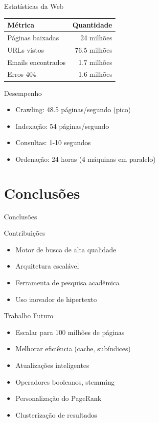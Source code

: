 \documentclass{beamer}
\begin{document}
\begin{frame}{Estatísticas da Web}
    \begin{center}
        \begin{tabular}{|l|r|}
            \hline
            \textbf{Métrica} & \textbf{Quantidade} \\
            \hline
            Páginas baixadas & 24 milhões \\
            URLs vistos & 76.5 milhões \\
            Emails encontrados & 1.7 milhões \\
            Erros 404 & 1.6 milhões \\
            \hline
        \end{tabular}
    \end{center}
\end{frame}

\begin{frame}{Desempenho}
    \begin{itemize}
        \item Crawling: 48.5 páginas/segundo (pico)
        \item Indexação: 54 páginas/segundo
        \item Consultas: 1-10 segundos
        \item Ordenação: 24 horas (4 máquinas em paralelo)
    \end{itemize}
\end{frame}

\section{Conclusões}
\begin{frame}{Conclusões}
    \begin{block}{Contribuições}
        \begin{itemize}
            \item Motor de busca de alta qualidade
            \item Arquitetura escalável
            \item Ferramenta de pesquisa acadêmica
            \item Uso inovador de hipertexto
        \end{itemize}
    \end{block}
\end{frame}

\begin{frame}{Trabalho Futuro}
    \begin{itemize}
        \item Escalar para 100 milhões de páginas
        \item Melhorar eficiência (cache, subíndices)
        \item Atualizações inteligentes
        \item Operadores booleanos, stemming
        \item Personalização do PageRank
        \item Clusterização de resultados
    \end{itemize}
\end{frame}
\end{document}
